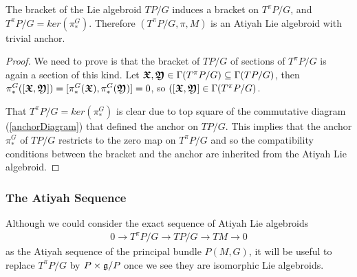 \begin{theorem}
The bracket of the Lie algebroid $TP/G$ induces a bracket on $T^\pi P/G$, and $T^\pi P/G = ker(\pi_*^G)$. Therefore $(T^\pi P/G, \pi, M)$ is an Atiyah Lie algebroid with trivial anchor.
\end{theorem}

\begin{proof}
We need to prove is that the bracket of $TP/G$ of sections of $T^\pi P/G$ is again a section of this kind. Let $\bm{\mathfrak{X}}, \bm{\mathfrak{Y}} \in \Gamma(T^\pi P/G) \subseteq \Gamma(TP/G)$, then $\pi_*^G([\bm{\mathfrak{X}}, \bm{\mathfrak{Y}}]) = [\pi_*^G (\bm{\mathfrak{X}}), \pi_*^G(\bm{\mathfrak{Y}})] = 0$, so $([\bm{\mathfrak{X}}, \bm{\mathfrak{Y}}] \in \Gamma(T^\pi P/G)$. 

That $T^\pi P/G = ker(\pi_*^G)$ is clear due to top square of the commutative diagram (\ref{anchorDiagram}) that defined the anchor on $TP/G$. This implies that the anchor $\pi_*^G$ of $TP/G$ restricts to the zero map on $T^\pi P/G$ and so the compatibility conditions between the bracket and the anchor are inherited from the Atiyah Lie algebroid.
\end{proof}

\subsubsection{The Atiyah Sequence}%

Although we could consider the exact sequence of Atiyah Lie algebroids
\begin{align*}
    0 \to T^\pi P/G \to TP/G \to TM \to 0
\end{align*}
as the Atiyah sequence of the principal bundle $P(M, G)$, it will be useful to replace $T^\pi P/G$ by $P \times \mathfrak{g}/P$ once we see they are isomorphic Lie algebroids.


